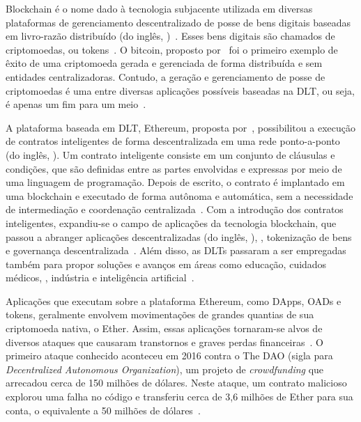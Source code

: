 \newcommand{\comando}[1]{\textbf{$\backslash$#1}}


Blockchain é o nome dado à tecnologia subjacente utilizada em diversas plataformas de gerenciamento descentralizado de posse de bens digitais baseadas em livro-razão distribuído (do inglês,  )~\cite{kannengiesser2020trade-offs-acmcs}. Esses bens digitais são chamados de criptomoedas, ou tokens~\cite{angelo2020tokens}. O bitcoin, proposto por~ foi o primeiro exemplo de êxito de uma criptomoeda gerada e gerenciada de forma distribuída e sem entidades centralizadoras. Contudo, a geração e gerenciamento de posse de criptomoedas é uma entre diversas aplicações possíveis baseadas na DLT, ou seja, é apenas um fim para um meio~\cite{overview-blockchainbasic2018drescher}.

A plataforma baseada em DLT, Ethereum, proposta por~, possibilitou a execução de contratos inteligentes de forma descentralizada em uma rede ponto-a-ponto (do inglês, ). Um contrato inteligente consiste em um conjunto de cláusulas e condições, que são definidas entre as partes envolvidas e expressas por meio de uma linguagem de programação. Depois de escrito, o contrato é implantado em uma blockchain e executado de forma autônoma e automática, sem a necessidade de intermediação e coordenação centralizada~\cite{overview-smartcontracts2020zheng}. Com a introdução dos contratos inteligentes, expandiu-se o campo de aplicações da tecnologia blockchain, que passou a abranger aplicações descentralizadas (do inglês, ), , tokenização de bens e governança descentralizada~\cite{maesa2020blockchain3.0, monrat2019survey-blockchain-ieee, angelo2020tokens}. Além disso, as DLTs passaram a ser empregadas também para propor soluções e avanços em áreas como educação, cuidados médicos, , indústria e inteligência artificial~\cite{casino2019block-app-survey-elsevier, salah2019review-blockchain-ai}.

Aplicações que executam sobre a plataforma Ethereum, como DApps, OADs e tokens, geralmente envolvem movimentações de grandes quantias de sua criptomoeda nativa, o Ether. Assim, essas aplicações tornaram-se alvos de diversos ataques que causaram transtornos e graves perdas financeiras~\cite{atzei2017survey-attacks-sok, chen2020survey-ethereum-acm}. O primeiro ataque conhecido aconteceu em 2016 contra o The DAO (sigla para \textit{Decentralized
Autonomous Organization}), um projeto de \textit{crowdfunding} que arrecadou cerca de 150 milhões de dólares. Neste ataque, um contrato malicioso explorou uma falha no código e transferiu cerca de 3,6 milhões de Ether para sua conta, o equivalente a 50 milhões de dólares~\cite{siegel-dao-attack}. 

